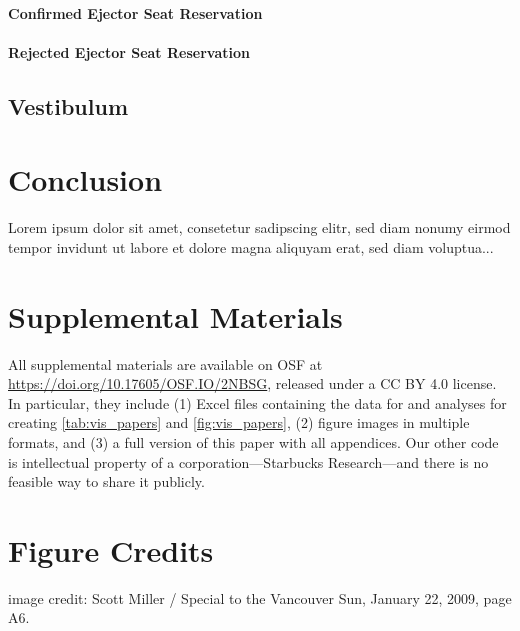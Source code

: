 \documentclass[widereview]{vgtc}             %
\begin{document}
\paragraph{Confirmed Ejector Seat Reservation}

\lipsum[1]

\paragraph{Rejected Ejector Seat Reservation}

\lipsum[1]

\subsection{Vestibulum}

\lipsum

\section{Conclusion}

Lorem ipsum dolor sit amet, consetetur sadipscing elitr, sed diam nonumy eirmod tempor invidunt ut labore et dolore magna aliquyam erat, sed diam voluptua...




\section*{Supplemental Materials}
\label{sec:supplemental_materials}

All supplemental materials are available on OSF at \url{https://doi.org/10.17605/OSF.IO/2NBSG}, released under a CC BY 4.0 license.
In particular, they include (1) Excel files containing the data for and analyses for creating \cref{tab:vis_papers} and \cref{fig:vis_papers}, (2) figure images in multiple formats, and (3) a full version of this paper with all appendices.
Our other code is intellectual property of a corporation---Starbucks Research---and there is no feasible way to share it publicly.


\section*{Figure Credits}

 image credit: Scott Miller / Special to the Vancouver Sun, January 22, 2009, page A6.
\end{document}
